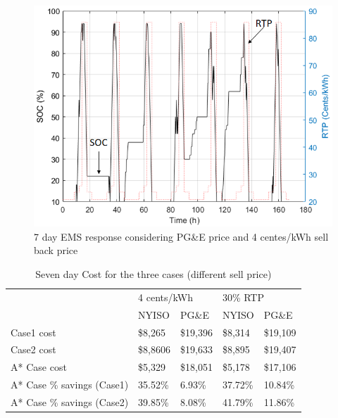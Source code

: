  \begin{figure}[!ht]
    \centering
    \includegraphics[width = 0.8\linewidth]{figs/PG_VAR_10_12_4.png}
    \caption{7 day EMS response considering PG\&E price and 4 centes/kWh sell back price}
    \label{fig:PG_VAR_10_12_4}
\end{figure}



\begin{table}[htb]
\caption{Seven day Cost for the three cases (different sell price)}
\label{tab:Cost}
\centering

\begin{tabular}{l|l|l|l|l|}
\cline{2-5}
                            & \multicolumn{2}{l|}{4 cents/kWh} & \multicolumn{2}{l|}{30\% RTP}   \\ \cline{2-5} 
                            & NYISO           & PG\&E          & NYISO          & PG\&E          \\ \hline
\multicolumn{1}{|l|}{Case1 cost} & \$8,265  & \$19,396 & \$8,314 & \$19,109 \\ \hline
\multicolumn{1}{|l|}{Case2 cost} & \$8,8606  & \$19,633 & \$8,895 & \$19,407 \\ \hline
\multicolumn{1}{|l|}{A* Case cost} & \$5,329  & \$18,051 & \$5,178 & \$17,106 \\ \hline
\multicolumn{1}{|l|}{A* Case \% savings (Case1)} & 35.52\%         & 6.93\%         & 37.72\%        & 10.84\%        \\ \hline
\multicolumn{1}{|l|}{A* Case \% savings (Case2)} & 39.85\%         & 8.08\%         & 41.79\%        & 11.86\%        \\ \hline
\end{tabular}

\end{table}

